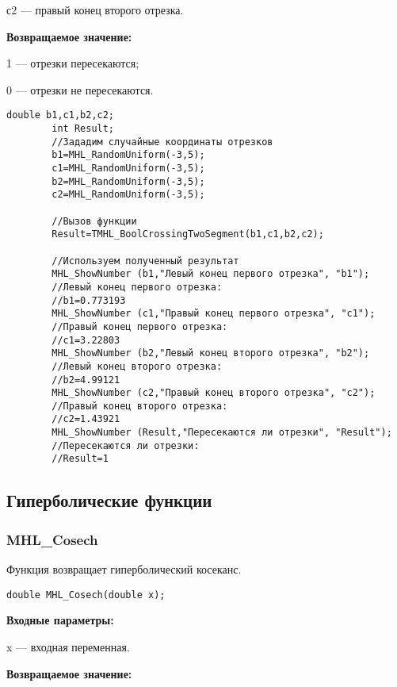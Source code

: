 \documentclass[a4paper,12pt]{article}
\begin{document}
с2 --- правый конец второго отрезка.

\textbf{Возвращаемое значение:}
 
1 --- отрезки пересекаются;
 
0 --- отрезки не пересекаются.


\begin{lstlisting}[label=code_use_TMHL_BoolCrossingTwoSegment,caption=Пример использования]
        double b1,c1,b2,c2;
        int Result;
        //Зададим случайные координаты отрезков
        b1=MHL_RandomUniform(-3,5);
        c1=MHL_RandomUniform(-3,5);
        b2=MHL_RandomUniform(-3,5);
        c2=MHL_RandomUniform(-3,5);

        //Вызов функции
        Result=TMHL_BoolCrossingTwoSegment(b1,c1,b2,c2);

        //Используем полученный результат
        MHL_ShowNumber (b1,"Левый конец первого отрезка", "b1");
        //Левый конец первого отрезка:
        //b1=0.773193
        MHL_ShowNumber (c1,"Правый конец первого отрезка", "c1");
        //Правый конец первого отрезка:
        //c1=3.22803
        MHL_ShowNumber (b2,"Левый конец второго отрезка", "b2");
        //Левый конец второго отрезка:
        //b2=4.99121
        MHL_ShowNumber (c2,"Правый конец второго отрезка", "c2");
        //Правый конец второго отрезка:
        //c2=1.43921
        MHL_ShowNumber (Result,"Пересекаются ли отрезки", "Result");
        //Пересекаются ли отрезки:
        //Result=1
\end{lstlisting}

\subsection{Гиперболические функции}

\subsubsection{MHL\_Cosech}\label{MHL_Cosech}

Функция возвращает гиперболический косеканс.


\begin{lstlisting}[label=code_syntax_MHL_Cosech,caption=Синтаксис]
double MHL_Cosech(double x);
\end{lstlisting}

\textbf{Входные параметры:}

 x --- входная переменная.

\textbf{Возвращаемое значение:}
\end{document}
